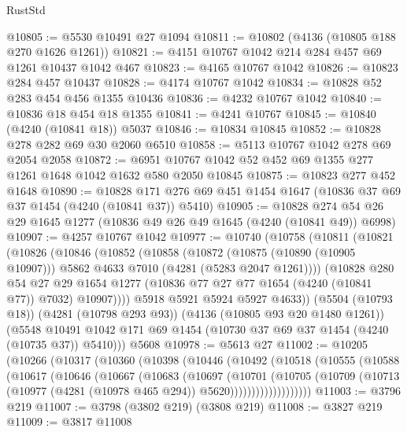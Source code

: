 \begin{lexlean}{RustStd}
\begin{coremodule}
@10805 := @5530 @10491 @27 @1094
@10811 := @10802 (@4136 (@10805 @188 @270 @1626 @1261))
@10821 := @4151 @10767 @1042 @214 @284 @457 @69 @1261 @10437 @1042 @467
@10823 := @4165 @10767 @1042
@10826 := @10823 @284 @457 @10437
@10828 := @4174 @10767 @1042
@10834 := @10828 @52 @283 @454 @456 @1355 @10436
@10836 := @4232 @10767 @1042
@10840 := @10836 @18 @454 @18 @1355
@10841 := @4241 @10767
@10845 := @10840 (@4240 (@10841 @18)) @5037
@10846 := @10834 @10845
@10852 := @10828 @278 @282 @69 @30 @2060 @6510
@10858 := @5113 @10767 @1042 @278 @69 @2054 @2058
@10872 := @6951 @10767 @1042 @52 @452 @69 @1355 @277 @1261 @1648 @1042 @1632 @580 @2050 @10845
@10875 := @10823 @277 @452 @1648
@10890 := @10828
    @171
    @276
    @69
    @451
    @1454
    @1647
    (@10836 @37 @69 @37 @1454 (@4240 (@10841 @37)) @5410)
@10905 := @10828 @274 @54 @26 @29 @1645 @1277 (@10836 @49 @26 @49 @1645 (@4240 (@10841 @49)) @6998)
@10907 := @4257 @10767 @1042
@10977 := @10740
    (@10758
      (@10811
        (@10821
          (@10826
            (@10846
              (@10852
                (@10858
                  (@10872
                    (@10875 (@10890 (@10905 @10907)))
                    @5862
                    @4633
                    @7010
                    (@4281 (@5283 @2047 @1261))))
                (@10828
                  @280
                  @54
                  @27
                  @29
                  @1654
                  @1277
                  (@10836 @77 @27 @77 @1654 (@4240 (@10841 @77)) @7032)
                  @10907))))
          @5918
          @5921
          @5924
          @5927
          @4633))
      (@5504 (@10793 @18))
      (@4281 (@10798 @293 @93))
      (@4136 (@10805 @93 @20 @1480 @1261))
      (@5548 @10491 @1042 @171 @69 @1454 (@10730 @37 @69 @37 @1454 (@4240 (@10735 @37)) @5410)))
    @5608
@10978 := @5613 @27
@11002 := @10205
    (@10266
      (@10317
        (@10360
          (@10398
            (@10446
              (@10492
                (@10518
                  (@10555
                    (@10588
                      (@10617
                        (@10646
                          (@10667
                            (@10683
                              (@10697
                                (@10701
                                  (@10705
                                    (@10709
                                      (@10713
                                        (@10977 (@4281 (@10978 @465 @294)) @5620)))))))))))))))))))
@11003 := @3796 @219
@11007 := @3798 (@3802 @219) (@3808 @219)
@11008 := @3827 @219
@11009 := @3817 @11008

\end{coremodule}
\end{lexlean}
